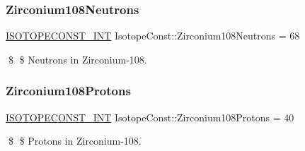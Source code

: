 \subsubsection{\texorpdfstring{Zirconium108\+Neutrons}{Zirconium108Neutrons}}
{\footnotesize\ttfamily \mbox{\hyperlink{group___isotope_const-_macros_ga5f18360b3e99483a35c32d789e62621c}{I\+S\+O\+T\+O\+P\+E\+C\+O\+N\+S\+T\+\_\+\+I\+NT}} Isotope\+Const\+::\+Zirconium108\+Neutrons = 68}

\$ \$ Neutrons in Zirconium-\/108. \mbox{\label{group___isotope_const-_zirconium-_zr108_ga44b0b05665a37c9c886cd040cf3de88a}} 
\subsubsection{\texorpdfstring{Zirconium108\+Protons}{Zirconium108Protons}}
{\footnotesize\ttfamily \mbox{\hyperlink{group___isotope_const-_macros_ga5f18360b3e99483a35c32d789e62621c}{I\+S\+O\+T\+O\+P\+E\+C\+O\+N\+S\+T\+\_\+\+I\+NT}} Isotope\+Const\+::\+Zirconium108\+Protons = 40}

\$ \$ Protons in Zirconium-\/108. 